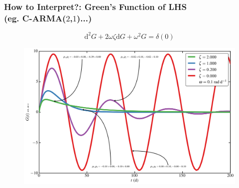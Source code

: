 \documentclass[hyperref={pdfpagelabels=false}]{beamer}
\begin{document}

\begin{frame}
\frametitle{How to Interpret?: Green's Function of LHS\\(eg. C-ARMA($2$,$1$)...)}
  \begin{equation*}\label{eq:CARMAGF} \mathrm{d}^{2}G + 2\omega\zeta \mathrm{d}G + \omega^{2}G = \delta(0) \end{equation*}
  \begin{figure}
    \includegraphics[scale=0.06]{images/CARMA(2,1)_GF.jpg}
  \end{figure}
\end{frame}
\end{document}

